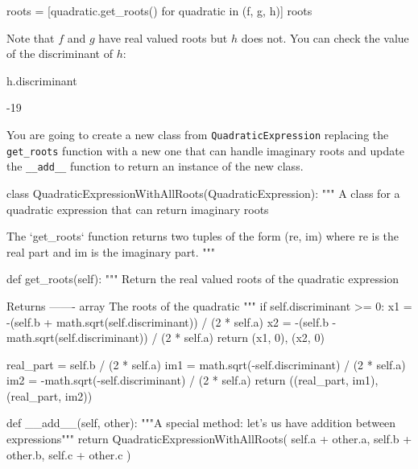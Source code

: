 \begin{pyin}
roots = [quadratic.get_roots() for quadratic in (f, g, h)]
roots
\end{pyin}





\begin{raw}
[(-1.4, 1.0), (1.3971808598447282, -2.1471808598447284), ()]
\end{raw}






Note that \(f\) and \(g\) have real valued roots but \(h\) does not. You can check
the value of the discriminant of \(h\):




\begin{pyin}
h.discriminant
\end{pyin}





\begin{raw}
-19
\end{raw}





You are going to create a new class from \texttt{QuadraticExpression} 
replacing the \texttt{get\_roots} function with a new one that can handle imaginary roots
and update the \texttt{\_\_add\_\_} function to return an instance of the new
class.




\begin{pyin}
class QuadraticExpressionWithAllRoots(QuadraticExpression):
    """
    A class for a quadratic expression that can return imaginary roots

    The `get_roots` function returns two tuples of the form (re, im) where re is
    the real part and im is the imaginary part.
    """

    def get_roots(self):
        """
        Return the real valued roots of the quadratic expression

        Returns
        -------
        array
            The roots of the quadratic
        """
        if self.discriminant >= 0:
            x1 = -(self.b + math.sqrt(self.discriminant)) / (2 * self.a)
            x2 = -(self.b - math.sqrt(self.discriminant)) / (2 * self.a)
            return (x1, 0), (x2, 0)

        real_part = self.b / (2 * self.a)
        im1 = math.sqrt(-self.discriminant) / (2 * self.a)
        im2 = -math.sqrt(-self.discriminant) / (2 * self.a)
        return ((real_part, im1), (real_part, im2))

    def __add__(self, other):
        """A special method: let's us have addition between expressions"""
        return QuadraticExpressionWithAllRoots(
            self.a + other.a, self.b + other.b, self.c + other.c
        )
\end{pyin}


